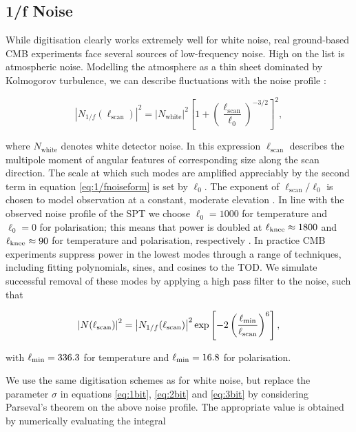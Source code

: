 \documentclass[a4paper,fleqn,usenatbib]{mnras}
\newcommand{\lknee}{\ensuremath{\ell_{\rm knee}}}
\newcommand{\lcut}{\ensuremath{\ell_{\rm min}}}
\begin{document}
\subsection{1/f Noise}
\label{subsec:oofnoise}

While digitisation clearly works extremely well for white noise, real ground-based CMB experiments face several sources of low-frequency noise. High on the list is atmospheric noise. Modelling the atmosphere as a thin sheet dominated by Kolmogorov turbulence, we can describe fluctuations with the noise profile \citep{lay2000}:

\begin{equation} \label{eq:1/fnoiseform}
\left| N_{1/f}(\ell_{\mathrm{scan}}) \right|^2 = \left| N_{\mathrm{white}} \right|^2 \left[ 1 + \left( \frac{\ell_{\mathrm{scan}}}{\ell_0} \right)^{-3/2} \right]^2,
\end{equation}


where $N_{\mathrm{white}}$ denotes white detector noise. In this expression $\ell_{\mathrm{scan}}$ describes the multipole moment of angular features of corresponding size along the scan direction. The scale at which such modes are amplified appreciably by the second term in equation \ref{eq:1/fnoiseform} is set by $\ell_0$. The exponent of $\ell_{\mathrm{scan}}/\ell_0$ is chosen to model observation at a constant, moderate elevation \citep{lay1997}. In line with the observed noise profile of the SPT we choose $\ell_0 = 1000$ for temperature and $\ell_0 = 0$ for polarisation; this means that power is doubled at $\lknee \approx 1800$ and $\lknee \approx 90$ for temperature and polarisation, respectively \citep{henning2018}. In practice CMB experiments suppress power in the lowest modes through a range of techniques, including fitting polynomials, sines, and cosines to the TOD. We simulate successful removal of these modes by applying a high pass filter to the noise, such that

\begin{equation} \label{eq:1/fnoiseformfinal}
\left| N (\ell_{\mathrm{scan}}) \right|^2 = \left| N_{1/f}(\ell_{\mathrm{scan}}) \right|^2 \exp\left[ -2\left( \frac{\lcut}{\ell_{\mathrm{scan}}} \right)^{6} \right],
\end{equation}

with $\lcut = 336.3$ for temperature and $\lcut = 16.8$ for polarisation.

We use the same digitisation schemes as for white noise, but replace the parameter $\sigma$ in equations \ref{eq:1bit}, \ref{eq:2bit} and \ref{eq:3bit} by considering Parseval's theorem on the above noise profile. The appropriate value is obtained by numerically evaluating the integral
\end{document}
